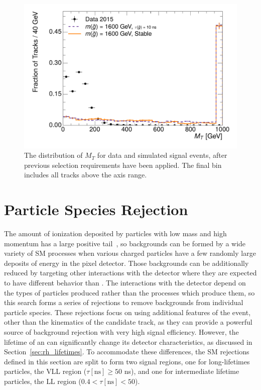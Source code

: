 \begin{figure}[h]
\centering
\includegraphics[width=\fullfig]{figures/selection_mt_nm1.pdf}
\caption{The distribution of $M_T$ for data and simulated signal events, after previous selection requirements have been applied. The final bin includes all tracks above the axis range.}
\label{fig:nm1_mt}
\end{figure}


\section{Particle Species Rejection}
\label{sec:sm_rejection}

The amount of ionization deposited by particles with low mass and high momentum has a large positive tail~\cite{pdg}, so backgrounds can be formed by a wide variety of \ac{SM} processes when various charged particles have a few randomly large deposits of energy in the pixel detector.
Those backgrounds can be additionally reduced by targeting other interactions with the detector where they are expected to have different behavior than \rhadrons.
The interactions with the detector depend on the types of particles produced rather than the processes which produce them, so this search forms a series of rejections to remove backgrounds from individual particle species.
These rejections focus on using additional features of the event, other than the kinematics of the candidate track, as they can provide a powerful source of background rejection with very high signal efficiency.
However, the lifetime of an \rhadron can significantly change its detector characteristics, as discussed in Section~\ref{sec:rh_lifetimes}.
To accommodate these differences, the \ac{SM} rejections defined in this section are split to form two signal regions, one for long-lifetimes particles, the \ac{VLL} region ($\tau [\mathrm{ns}] \geq 50$ ns), and one for intermediate lifetime particles, the \ac{LL} region ($0.4 < \tau [\mathrm{ns}] < 50$).

